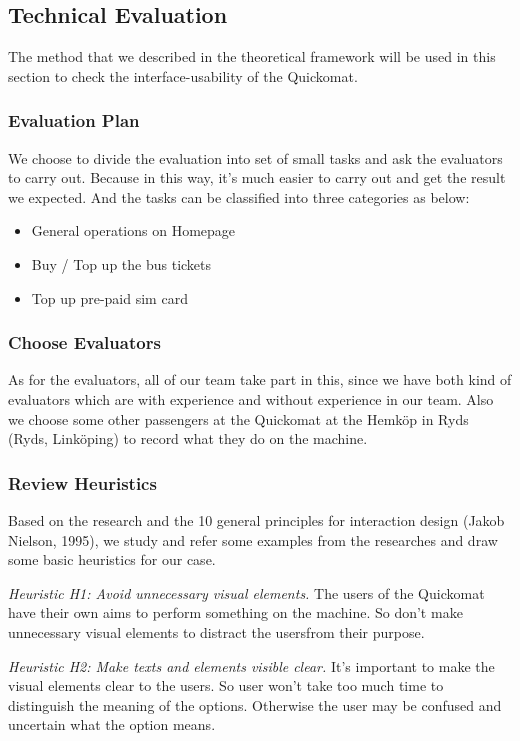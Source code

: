 \documentclass[twocolumn]{article}
\begin{document}
\subsection{Technical Evaluation}
The method that we described in the theoretical framework will be used in this section to check the interface-usability of the Quickomat.

\subsubsection{Evaluation Plan}
We choose to divide the evaluation into set of small tasks and ask the evaluators to carry out. Because in this way, it’s much easier to carry out and get the result we expected. And the tasks can be classified into three categories as below:
\begin{itemize}
  \item General operations on Homepage
  \item Buy / Top up the bus tickets
  \item Top up pre-paid sim card
\end{itemize}

\subsubsection{Choose Evaluators}
As for the evaluators, all of our team take part in this, since we have both kind of evaluators which are with experience and without experience in our team. Also we choose some other passengers at the Quickomat at the Hemköp in Ryds (Ryds, Linköping) to record what they do on the machine.

\subsubsection{Review Heuristics}
Based on the research and the 10 general principles for interaction design (Jakob Nielson, 1995), we study and refer some examples from the researches and draw some basic heuristics for our case.

\emph{Heuristic H1: Avoid unnecessary visual elements.} The users of the Quickomat have their own aims to perform something on the machine. So don’t make unnecessary visual elements to distract the usersfrom their purpose.

\emph{Heuristic H2: Make texts and elements visible clear.} It’s important to make the visual elements clear to the users. So user won’t take too much time to distinguish the meaning of the options. Otherwise the user may be confused and uncertain what the option means.
\end{document}
